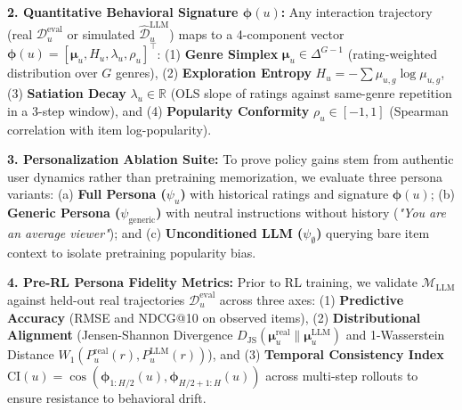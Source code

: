 \documentclass{article}
\begin{document}
\textbf{2. Quantitative Behavioral Signature $\bm{\phi}(u)$:} Any interaction trajectory (real $\mathcal{D}_{u}^{\text{eval}}$ or simulated $\hat{\mathcal{D}}_{u}^{\text{LLM}}$) maps to a 4-component vector $\bm{\phi}(u) = [\bm{\mu}_u, H_u, \lambda_u, \rho_u]^\top$: (1) \textbf{Genre Simplex} $\bm{\mu}_u \in \Delta^{G-1}$ (rating-weighted distribution over $G$ genres), (2) \textbf{Exploration Entropy} $H_u = -\sum \mu_{u,g} \log \mu_{u,g}$, (3) \textbf{Satiation Decay} $\lambda_u \in \mathbb{R}$ (OLS slope of ratings against same-genre repetition in a 3-step window), and (4) \textbf{Popularity Conformity} $\rho_u \in [-1, 1]$ (Spearman correlation with item log-popularity).

\textbf{3. Personalization Ablation Suite:} To prove policy gains stem from authentic user dynamics rather than pretraining memorization, we evaluate three persona variants: (a) \textbf{Full Persona ($\psi_u$)} with historical ratings and signature $\bm{\phi}(u)$; (b) \textbf{Generic Persona ($\psi_{\text{generic}}$)} with neutral instructions without history (\textit{"You are an average viewer"}); and (c) \textbf{Unconditioned LLM ($\psi_{\emptyset}$)} querying bare item context to isolate pretraining popularity bias.

\textbf{4. Pre-RL Persona Fidelity Metrics:} Prior to RL training, we validate $\mathcal{M}_{\text{LLM}}$ against held-out real trajectories $\mathcal{D}_u^{\text{eval}}$ across three axes: (1) \textbf{Predictive Accuracy} (RMSE and NDCG@10 on observed items), (2) \textbf{Distributional Alignment} (Jensen-Shannon Divergence $D_{\text{JS}}(\bm{\mu}_u^{\text{real}} \parallel \bm{\mu}_u^{\text{LLM}})$ and 1-Wasserstein Distance $W_1(P_u^{\text{real}}(r), P_u^{\text{LLM}}(r))$), and (3) \textbf{Temporal Consistency Index} $\text{CI}(u) = \cos(\bm{\phi}_{1:H/2}(u), \bm{\phi}_{H/2+1:H}(u))$ across multi-step rollouts to ensure resistance to behavioral drift.
\end{document}
